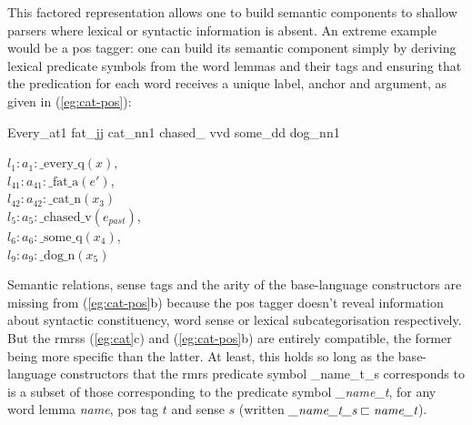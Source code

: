 This factored representation allows one to build semantic components
to shallow parsers where lexical or syntactic information is absent.
An extreme example would be a {\sc 
  pos} tagger: one can build its semantic component simply by deriving
lexical predicate symbols from the word lemmas and their tags and ensuring
that the predication for each word receives a unique label, anchor and
argument, as given in (\ref{eg:cat-pos}):
\begin{examples}
\item   \label{eg:cat-pos}
\begin{subexamples}
\item   Every\_{\sc at1} fat\_{\sc jj} cat\_{\sc nn1} chased\_{\sc
    vvd} some\_{\sc dd} dog\_{\sc nn1}
\item   $l_1:a_1:\mbox{\_every\_q}(x)$, \\
$l_{41}:a_{41}:\mbox{\_fat\_a}(e')$,\\
$l_{42}:a_{42}:\mbox{\_cat\_n}(x_3)$\\
$l_5:a_5:\mbox{\_chased\_v}(e_{past})$, \\
$l_6:a_6:\mbox{\_some\_q}(x_4)$, \\
$l_9:a_9:\mbox{\_dog\_n}(x_5)$
\end{subexamples}
\end{examples}


Semantic relations, sense tags and the arity of the base-language
constructors are
missing from (\ref{eg:cat-pos}b) because the {\sc pos} tagger doesn't
reveal information about syntactic constituency, word sense or lexical
subcategorisation respectively.  
But the {\sc rmrs}s (\ref{eg:cat}c) and
(\ref{eg:cat-pos}b) are entirely compatible, the former being more
specific than the latter.  At least, this holds so long as the
base-language constructors that the {\sc rmrs} predicate symbol
{\_name\_t\_s} corresponds to is a 
subset of those corresponding to the predicate symbol {\em \_name\_t},
for any word lemma {\em name}, {\sc pos} tag $t$ and sense $s$ (written 
$\mbox{{\em \_name\_t\_s}} \sqsubset \mbox{{\em name\_t}}$). 

